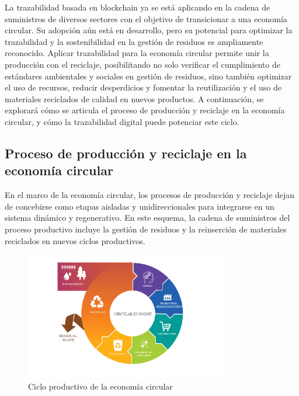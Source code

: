 La trazabilidad basada en blockchain ya se está aplicando en la cadena de suministros de diversos sectores con el objetivo de transicionar a una economía circular. Su adopción aún está en desarrollo, pero su potencial para optimizar la trazabilidad y la sostenibilidad en la gestión de residuos es ampliamente reconocido. Aplicar trazabilidad para la economía circular permite unir la producción con el reciclaje, posibilitando no solo verificar el cumplimiento de estándares ambientales y sociales en gestión de residuos, sino también optimizar el uso de recursos, reducir desperdicios y fomentar la reutilización y el uso de materiales reciclados de calidad en nuevos productos. A continuación, se explorará cómo se articula el proceso de producción y reciclaje en la economía circular, y cómo la trazabilidad digital puede potenciar este ciclo.

\subsection{Proceso de producción y reciclaje en la economía circular}

En el marco de la economía circular, los procesos de producción y reciclaje dejan de concebirse como etapas aisladas y unidireccionales para integrarse en un sistema dinámico y regenerativo. En este esquema, la cadena de suministros del proceso productivo incluye la gestión de residuos y la reinserción de materiales reciclados en nuevos ciclos productivos. 

\begin{figure}[!htpb]
    \centering
    \includegraphics[width=0.8\textwidth]{Figures/circular-economy-stages.png}
    \caption{Ciclo productivo de la economía circular}
    \label{fig:circular-economy-stages}
\end{figure}

